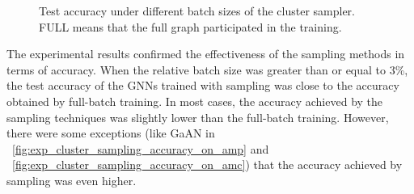 \begin{figure}[H]
    \centering
    \caption{Test accuracy under different batch sizes of the cluster sampler. FULL means that the full graph participated in the training.}
    \label{fig:exp_sampling_relative_batch_size_accuracy_cluster}
\end{figure}

The experimental results confirmed the effectiveness of the sampling methods in terms of accuracy.
%
When the relative batch size was greater than or equal to 3\%, the test accuracy of the GNNs trained with sampling was close to the accuracy obtained by full-batch training.
%
In most cases, the accuracy achieved by the sampling techniques was slightly lower than the full-batch training.
%
However, there were some exceptions (like GaAN in \figurename~\ref{fig:exp_cluster_sampling_accuracy_on_amp} and \figurename~\ref{fig:exp_cluster_sampling_accuracy_on_amc}) that the accuracy achieved by sampling was even higher.

